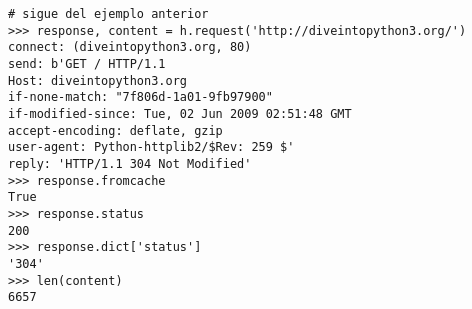 \noindent\begin{minipage}{\textwidth}
\begin{lstlisting}[mathescape=True]
# sigue del ejemplo anterior 
>>> response, content = h.request('http://diveintopython3.org/')
connect: (diveintopython3.org, 80)
send: b'GET / HTTP/1.1
Host: diveintopython3.org
if-none-match: "7f806d-1a01-9fb97900"                   
if-modified-since: Tue, 02 Jun 2009 02:51:48 GMT       
accept-encoding: deflate, gzip
user-agent: Python-httplib2/$Rev: 259 $'
reply: 'HTTP/1.1 304 Not Modified'                    
>>> response.fromcache                               
True
>>> response.status                                 
200
>>> response.dict['status']                        
'304'
>>> len(content)                                  
6657
\end{lstlisting}
\end{minipage}

